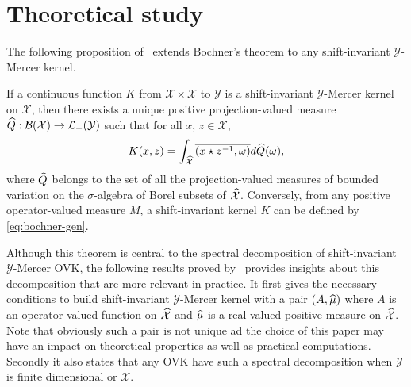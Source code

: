 \section{Theoretical study}
The following proposition of~\citet{Zhang2012,Carmeli2010} extends Bochner's theorem to any shift-invariant $\mathcal{Y}$-Mercer kernel.
\begin{proposition}\label{eq:bochner-gen}
If a continuous function $K$ from $\mathcal{X} \times \mathcal{X}$ to $\mathcal{Y}$ is a shift-invariant $\mathcal{Y}$-Mercer kernel on $\mathcal{X}$, then there exists a unique positive projection-valued measure $\widehat{Q}: \mathcal{B}(\mathcal{X}) \to \mathcal{L}_+(\mathcal{Y})$ such that for all $x$, $z \in \mathcal{X}$,
\begin{dmath}
K(x, z) = \int_{\dual{\mathcal{X}}} \conj{\pairing{x \groupop \inv{z}, \omega}} d\dual{Q}(\omega),
\end{dmath}
where $\widehat{Q}$ belongs to the set of all the projection-valued measures of bounded variation on the $\sigma$-algebra of Borel subsets of $\widehat{\mathcal{X}}$. Conversely, from any positive operator-valued measure $M$, a shift-invariant kernel $K$ can be defined by \cref{eq:bochner-gen}.
\end{proposition}
Although this theorem is central to the spectral decomposition of shift-invariant $\mathcal{Y}$-Mercer \acs{OVK}, the following results proved by~\citet{Carmeli2010} provides insights about this decomposition that are more relevant in practice. It first gives the necessary conditions to build shift-invariant $\mathcal{Y}$-Mercer kernel with  a pair $(A, \widehat{\mu})$ where $A$ is an operator-valued function on $\widehat{\mathcal{X}}$ and $\widehat{\mu}$ is a real-valued positive measure on $\widehat{\mathcal{X}}$. Note that obviously such a pair is not unique ad the choice of this paper may have an impact on theoretical properties as well as practical computations.
Secondly it also states that any \acs{OVK} have such a spectral decomposition when $\mathcal{Y}$ is finite dimensional or $\mathcal{X}$.

